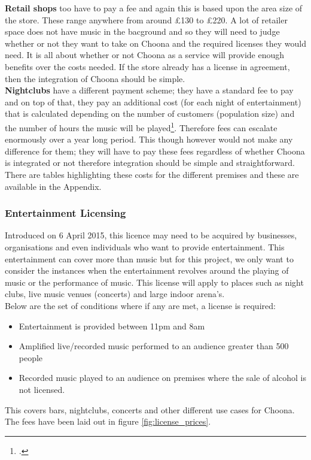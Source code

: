 \textbf{Retail shops} too have to pay a fee and again this is based upon the area size of the store.  These range anywhere from around £130 to £220.  A lot of retailer space does not have music in the bacground and so they will need to judge whether or not they want to take on Choona and the required licenses they would need. It is all about whether or not Choona as a service will provide enough benefits over the costs needed.  If the store already has a license in agreement, then the integration of Choona should be simple.  \\
\textbf{Nightclubs} have a different payment scheme; they have a standard fee to pay and on top of that, they pay an additional cost (for each night of entertainment) that is calculated depending on the number of customers (population size) and the number of hours the music will be played\footcite{ppl}.  Therefore fees can escalate enormously over a year long period.  This though however would not make any difference for them; they will have to pay these fees regardless of whether Choona is integrated or not therefore integration should be simple and straightforward.  
There are tables highlighting these costs for the different premises and these are available in the Appendix.  
      
\subsubsection{Entertainment Licensing}   
Introduced on 6 April 2015, this licence may need to be acquired by businesses, organisations and even individuals who want to provide entertainment.  This entertainment can cover more than music but for this project, we only want to consider the instances when the entertainment revolves around the playing of music or the performance of music.  This license will apply to places such as night clubs, live music venues (concerts) and large indoor arena's.\\
Below are the set of conditions where if any are met, a license is required:
\begin{itemize}
\item Entertainment is provided between 11pm and 8am
\item Amplified live/recorded music performed to an audience greater than 500 people
\item Recorded music played to an audience on premises where the sale of alcohol is not licensed.
\end{itemize}
This covers bars, nightclubs, concerts and other different use cases for Choona.  The fees have been laid out in figure \ref{fig:license_prices}.\\ 

